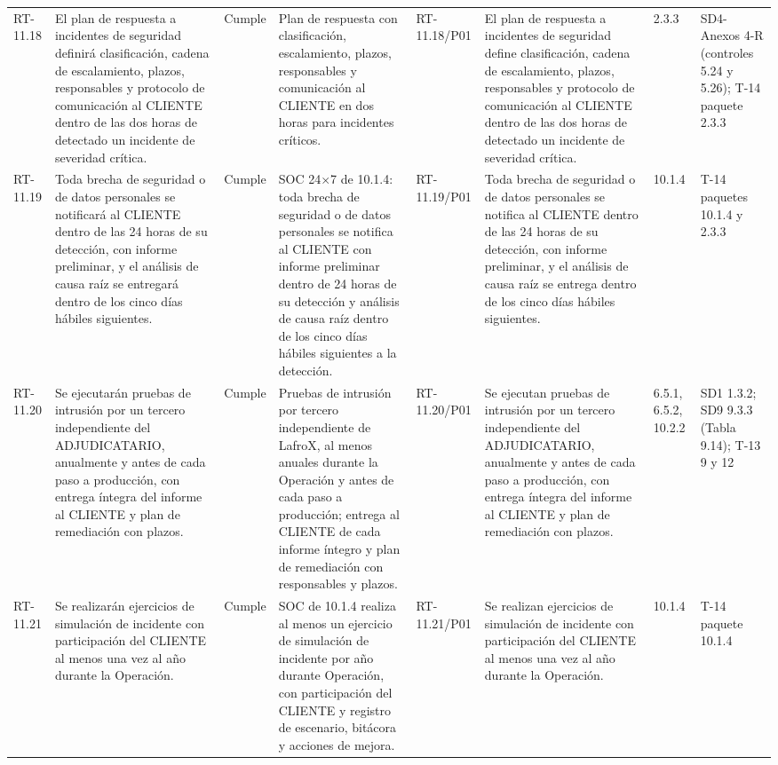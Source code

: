 \documentclass[oficio,firma,final]{lafrox}
\begin{document}
\begin{landscape}
{\begin{longtable}{@{}F{0.054} F{0.173} F{0.061} F{0.191} F{0.106} F{0.180} F{0.067} F{0.168}@{}}
  RT-11.18 & El plan de respuesta a incidentes de seguridad definirá clasificación, cadena de escalamiento, plazos, responsables y protocolo de comunicación al CLIENTE dentro de las dos horas de detectado un incidente de severidad crítica. & Cumple & Plan de respuesta con clasificación, escalamiento, plazos, responsables y comunicación al CLIENTE en dos horas para incidentes críticos. & RT-11.18/\allowbreak{}P01 & El plan de respuesta a incidentes de seguridad define clasificación, cadena de escalamiento, plazos, responsables y protocolo de comunicación al CLIENTE dentro de las dos horas de detectado un incidente de severidad crítica. & 2.3.3 & SD4-Anexos 4-R (controles 5.24 y 5.26); T-14 paquete 2.3.3  \\
  RT-11.19 & Toda brecha de seguridad o de datos personales se notificará al CLIENTE dentro de las 24 horas de su detección, con informe preliminar, y el análisis de causa raíz se entregará dentro de los cinco días hábiles siguientes. & Cumple & SOC 24$\times$7 de 10.1.4: toda brecha de seguridad o de datos personales se notifica al CLIENTE con informe preliminar dentro de 24 horas de su detección y análisis de causa raíz dentro de los cinco días hábiles siguientes a la detección. & RT-11.19/\allowbreak{}P01 & Toda brecha de seguridad o de datos personales se notifica al CLIENTE dentro de las 24 horas de su detección, con informe preliminar, y el análisis de causa raíz se entrega dentro de los cinco días hábiles siguientes. & 10.1.4 & T-14 paquetes 10.1.4 y 2.3.3  \\
  RT-11.20 & Se ejecutarán pruebas de intrusión por un tercero independiente del ADJUDICATARIO, anualmente y antes de cada paso a producción, con entrega íntegra del informe al CLIENTE y plan de remediación con plazos. & Cumple & Pruebas de intrusión por tercero independiente de LafroX, al menos anuales durante la Operación y antes de cada paso a producción; entrega al CLIENTE de cada informe íntegro y plan de remediación con responsables y plazos. & RT-11.20/\allowbreak{}P01 & Se ejecutan pruebas de intrusión por un tercero independiente del ADJUDICATARIO, anualmente y antes de cada paso a producción, con entrega íntegra del informe al CLIENTE y plan de remediación con plazos. & 6.5.1, 6.5.2, 10.2.2 & SD1 1.3.2; SD9 9.3.3 (Tabla 9.14); T-13 9 y 12  \\
  RT-11.21 & Se realizarán ejercicios de simulación de incidente con participación del CLIENTE al menos una vez al año durante la Operación. & Cumple & SOC de 10.1.4 realiza al menos un ejercicio de simulación de incidente por año durante Operación, con participación del CLIENTE y registro de escenario, bitácora y acciones de mejora. & RT-11.21/\allowbreak{}P01 & Se realizan ejercicios de simulación de incidente con participación del CLIENTE al menos una vez al año durante la Operación. & 10.1.4 & T-14 paquete 10.1.4  \\

\end{longtable}}
\end{landscape}
\end{document}
